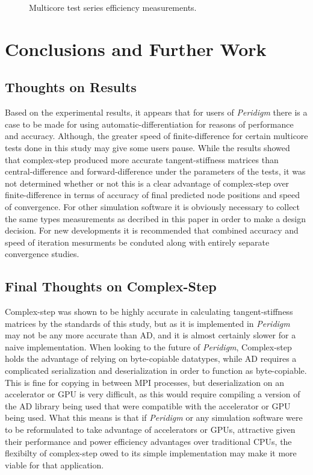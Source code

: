\documentclass[preprint,12pt]{elsarticle}
\begin{document}
\begin{figure}[h]
  \centering
  \scalebox{1.0}{}
  \caption{Multicore test series efficiency measurements.}
  \label{fig:multi_efficiency}
\end{figure}

\section{Conclusions and Further Work}

\subsection{Thoughts on Results} Based on the experimental results, it appears that for users of
\emph{Peridigm} there is a case to be made for using automatic-differentiation for reasons of
performance and accuracy. Although, the greater speed of finite-difference for certain multicore
tests done in this study may give some users pause. While the results showed that complex-step
produced more accurate tangent-stiffness matrices than central-difference and forward-difference 
under the parameters of the tests, it was not determined whether or not this is a clear advantage of complex-step over
finite-difference in terms of accuracy of final predicted node positions and speed of convergence. For other
simulation software it is obviously necessary to collect the same types measurements as decribed in
this paper in order to make a design decision. For new developments it is recommended that combined
accuracy and speed of iteration mesurments be conduted along with entirely separate convergence
studies. 

\subsection{Final Thoughts on Complex-Step} Complex-step was shown to be highly accurate in
calculating tangent-stiffness matrices by the standards of this study, but as it is implemented in
\emph{Peridigm} may not be any more accurate than AD, and it is almost certainly slower for a naive
implementation. When looking to the future of \emph{Peridigm}, Complex-step holds the advantage of
relying on byte-copiable datatypes, while AD requires a complicated serialization and
deserialization in order to function as byte-copiable. This is fine for copying in between MPI
processes, but deserialization on an accelerator or GPU is very difficult, as this would require
compiling a version of the AD library being used that were compatible with the accelerator or GPU
being used. What this means is that if \emph{Peridigm} or any simulation software were to be
reformulated to take advantage of accelerators or GPUs, attractive given their performance and power
efficiency advantages over traditional CPUs, the flexibilty of complex-step owed to its simple
implementation may make it more viable for that application.
\end{document}
